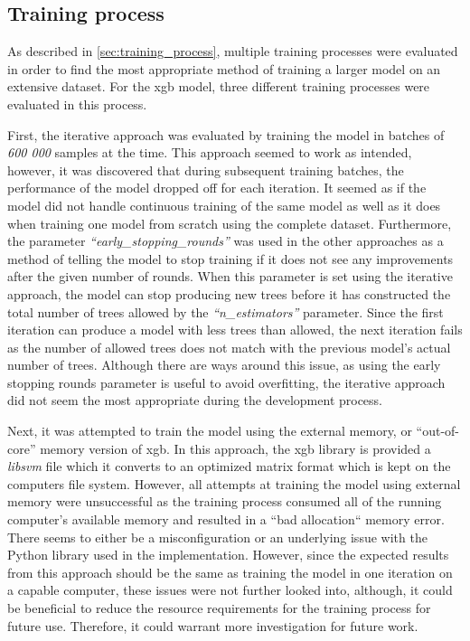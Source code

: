 \subsection{Training process}

As described in \cref{sec:training_process}, multiple training processes were evaluated in order to find the most appropriate method of training a larger model on an extensive dataset. For the \acrfull{xgb} model, three different training processes were evaluated in this process.

First, the iterative approach was evaluated by training the model in batches of \textit{600 000} samples at the time. This approach seemed to work as intended, however, it was discovered that during subsequent training batches, the performance of the model dropped off for each iteration. It seemed as if the model did not handle continuous training of the same model as well as it does when training one model from scratch using the complete dataset. Furthermore, the parameter \textit{``early\_stopping\_rounds''} was used in the other approaches as a method of telling the model to stop training if it does not see any improvements after the given number of rounds. When this parameter is set using the iterative approach, the model can stop producing new trees before it has constructed the total number of trees allowed by the \textit{``n\_estimators''} parameter. Since the first iteration can produce a model with less trees than allowed, the next iteration fails as the number of allowed trees does not match with the previous model's actual number of trees. Although there are ways around this issue, as using the early stopping rounds parameter is useful to avoid overfitting, the iterative approach did not seem the most appropriate during the development process.

Next, it was attempted to train the model using the external memory, or ``out-of-core'' memory version of \acrshort{xgb}. In this approach, the \acrshort{xgb} library is provided a \textit{libsvm} file which it converts to an optimized matrix format which is kept on the computers file system. However, all attempts at training the model using external memory were unsuccessful as the training process consumed all of the running computer's available memory and resulted in a ``bad allocation`` memory error. There seems to either be a misconfiguration or an underlying issue with the Python library used in the implementation. However, since the expected results from this approach should be the same as training the model in one iteration on a capable computer, these issues were not further looked into, although, it could be beneficial to reduce the resource requirements for the training process for future use. Therefore, it could warrant more investigation for future work.

